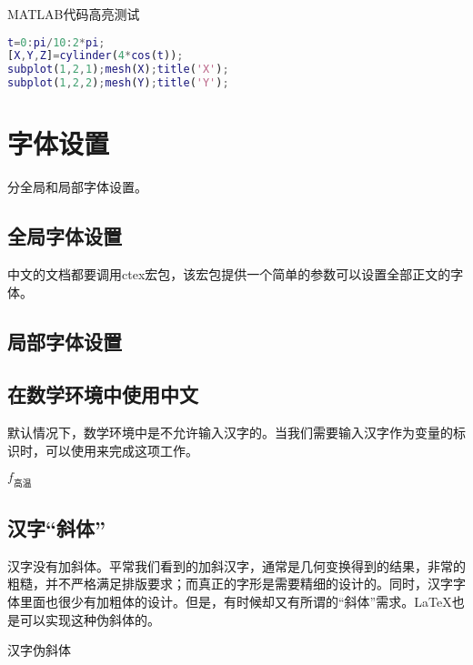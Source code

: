 MATLAB代码高亮测试


\begin{lstlisting}[language=Matlab]
t=0:pi/10:2*pi;
[X,Y,Z]=cylinder(4*cos(t));
subplot(1,2,1);mesh(X);title('X');
subplot(1,2,2);mesh(Y);title('Y');
\end{lstlisting}


\section{字体设置}

分全局和局部字体设置。
\subsection{全局字体设置}
中文的文档都要调用ctex宏包，该宏包提供一个简单的参数可以设置全部正文的字体。

\begin{latex}{}
\setmainfont{Times New Roman}	%
\end{latex}

\subsection{局部字体设置}

\begin{latex}{}
\newfontfamily{}	%
\end{latex}

\subsection{在数学环境中使用中文}
默认情况下，数学环境中是不允许输入汉字的。当我们需要输入汉字作为变量的标识时，可以使用来完成这项工作。

\begin{codeshow}
$f_{\text{高温}}$
\end{codeshow}

\subsection{汉字“斜体”}
汉字没有加斜体。平常我们看到的加斜汉字，通常是几何变换得到的结果，非常的粗糙，并不严格满足排版要求；而真正的字形是需要精细的设计的。同时，汉字字体里面也很少有加粗体的设计。但是，有时候却又有所谓的“斜体”需求。\LaTeX 也是可以实现这种伪斜体的。

\begin{center}
	{汉字伪斜体}
\end{center}

